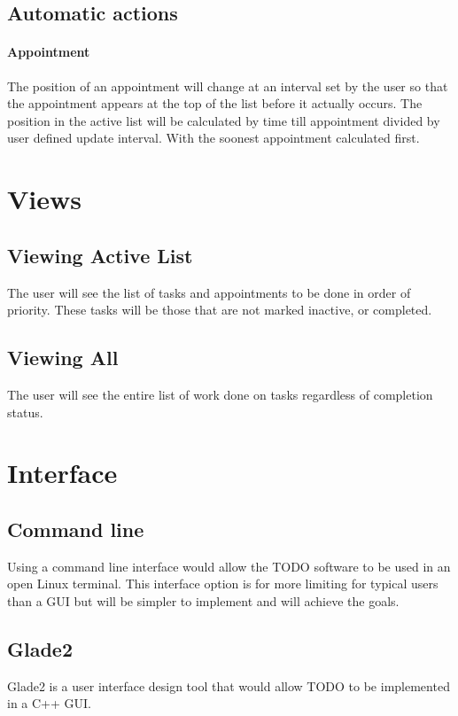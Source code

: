 \documentclass[12pt]{article}
\begin{document}
\subsection{Automatic actions}
\setcounter{paragraph}{0}
\setcounter{subsubsection}{0}
\paragraph{Appointment} \label{sec:Auto appointments} The position of an appointment will change at an interval set by the user so that the appointment appears at the top of the list before it actually occurs. The position in the active list will be calculated by time till appointment divided by user defined update interval. With the soonest appointment calculated first.


\section{Views}
\subsection{Viewing Active List}
The user will see the list of tasks and appointments to be done in order of priority. These tasks will be those that are not marked inactive, or completed.

\subsection{Viewing All} \label{sec:View all}
The user will see the entire list of work done on tasks regardless of completion status.

\section{Interface}
\subsection{Command line}
Using a command line interface would allow the TODO software to be used in an open Linux terminal. This interface option is for more limiting for typical users than a GUI but will be simpler to implement and will achieve the goals.

\subsection{Glade2}
Glade2 is a user interface design tool that would allow TODO to be implemented in a C++ GUI.  
\end{document}
